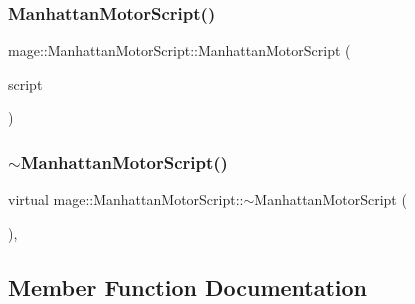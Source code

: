 \hypertarget{classmage_1_1_manhattan_motor_script_a3076d8c222953233e86202bd78f9504f}{}\label{classmage_1_1_manhattan_motor_script_a3076d8c222953233e86202bd78f9504f} 
\subsubsection{\texorpdfstring{Manhattan\+Motor\+Script()}{ManhattanMotorScript()}\hspace{0.1cm}{\footnotesize\ttfamily [3/3]}}
{\footnotesize\ttfamily mage\+::\+Manhattan\+Motor\+Script\+::\+Manhattan\+Motor\+Script (\begin{DoxyParamCaption}\item[{\hyperlink{classmage_1_1_manhattan_motor_script}{Manhattan\+Motor\+Script} \&\&}]{script }\end{DoxyParamCaption})\hspace{0.3cm}{\ttfamily [default]}}

\hypertarget{classmage_1_1_manhattan_motor_script_abce38dc8f3f6d96b921cced37accf172}{}\label{classmage_1_1_manhattan_motor_script_abce38dc8f3f6d96b921cced37accf172} 
\subsubsection{\texorpdfstring{$\sim$\+Manhattan\+Motor\+Script()}{~ManhattanMotorScript()}}
{\footnotesize\ttfamily virtual mage\+::\+Manhattan\+Motor\+Script\+::$\sim$\+Manhattan\+Motor\+Script (\begin{DoxyParamCaption}{ }\end{DoxyParamCaption})\hspace{0.3cm}{\ttfamily [virtual]}, {\ttfamily [default]}}



\subsection{Member Function Documentation}
\hypertarget{classmage_1_1_manhattan_motor_script_a420ed8a511a6f404056a31245bb7bed0}{}\label{classmage_1_1_manhattan_motor_script_a420ed8a511a6f404056a31245bb7bed0} 
